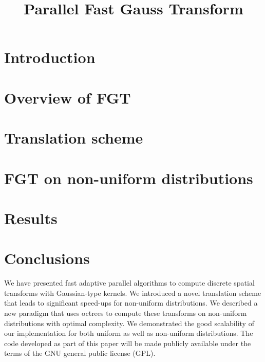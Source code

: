 \documentclass[conference]{IEEEtran}
\begin{document}
\title{Parallel Fast Gauss Transform}  


\author{

\and
{}

\and
{}
}
\date{}
\maketitle

\begin{abstract}

\end{abstract}

\section{Introduction}  
\label{s:intro}

%
\section{Overview of FGT} 
\label{sc:fgt}

%
\section{Translation scheme} 
\label{sc:sweep}

%
\section{FGT on non-uniform distributions} 
\label{sc:nonuniform}




\section{Results}
\label{sc:results}


\section{Conclusions}
\label{sc:conclusions}
We have presented fast adaptive parallel algorithms to compute discrete spatial transforms with Gaussian-type kernels.
We introduced a novel translation scheme that leads to significant speed-ups for non-uniform distributions. We described a
 new paradigm that uses octrees to compute these transforms on non-uniform distributions with optimal complexity. 
 We demonstrated the good scalability of our implementation for both uniform as well as non-uniform distributions. The
 code developed as part of this paper will be made publicly available under the terms of the GNU general public license (GPL). 
\end{document}
